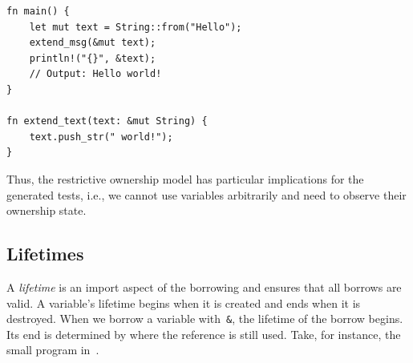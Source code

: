 \documentclass[paper=a4,%
  twoside,%
  BCOR4mm,%
  abstract=true,%
  toc=bibliography,%
  chapterprefix=true,%
  toc=bibliographynumbered,%
  open=right,%
  english,%
  pagesize=pdftex]{scrreprt}
\begin{document}
\begin{lstlisting}[style=boxed, caption=Transferring the ownership to a method, label=lst:mut-borrowing-method-call]
fn main() {
    let mut text = String::from("Hello");
    extend_msg(&mut text);
    println!("{}", &text);
    // Output: Hello world!
}

fn extend_text(text: &mut String) {
    text.push_str(" world!");
}
\end{lstlisting}

Thus, the restrictive ownership model has particular implications for the generated tests, i.e., we cannot use variables arbitrarily and need to observe their ownership state.

\subsection{Lifetimes}
A \emph{lifetime} is an import aspect of the borrowing and ensures that all borrows are valid. A variable's lifetime begins when it is created and ends when it is destroyed. When we borrow a variable with~\texttt{\&}, the lifetime of the borrow begins. Its end is determined by where the reference is still used. Take, for instance, the small program in~.
\end{document}
